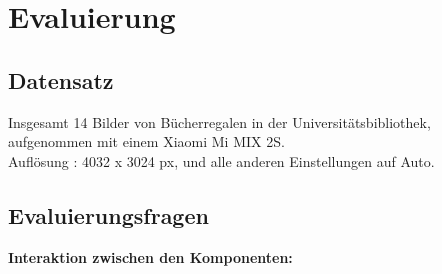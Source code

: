 \documentclass[paper=A4, deutsch]{scrartcl}
\begin{document}
\section{Evaluierung}
\subsection{Datensatz}
Insgesamt 14 Bilder von Bücherregalen in der Universitätsbibliothek, aufgenommen mit einem Xiaomi Mi MIX 2S.\\Auflösung : 4032 x 3024 px, und alle anderen Einstellungen auf Auto.
\subsection{Evaluierungsfragen}
\textbf{Interaktion zwischen den Komponenten:}
\end{document}
